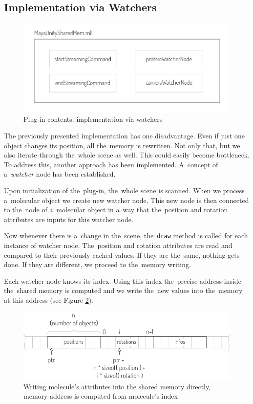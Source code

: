 \documentclass[
  digital, %
  table,   %
  nolof,     %
  nolot,     %
  oneside,
]{fithesis3}
\begin{document}
\subsection{Implementation via Watchers}
\begin{figure}
  \centering
  \includegraphics[scale=0.8]{images/plugin-contents-watchers.pdf}
  \caption{Plug-in contents: implementation via watchers}
  \label{fig:plugin-content-watchers}
\end{figure}

The previously presented implementation has one disadvantage. Even if just one object changes its position, all the memory is rewritten. Not only that, but we also iterate through the whole scene as well. This could easily become bottleneck. To address this, another approach has been implemented. A concept of a \textit{watcher} node has been established.

Upon initialization of the plug-in, the whole scene is scanned. When we process a molecular object we create new watcher node. This new node is then connected to the node of a molecular object in a way that the position and rotation attributes are inputs for this watcher node.

Now whenever there is a change in the scene, the \texttt{draw} method is called for each instance of watcher node. The position and rotation attributes are read and compared to their previously cached values. If they are the same, nothing gets done. If they are different, we proceed to the memory writing.

Each watcher node knows its index. Using this index the precise address inside the shared memory is computed and we write the new values into the memory at this address (see Figure \ref{fig:direct-writing}).

\begin{figure}
  \centering
  \includegraphics[scale=1.0]{images/direct-writing.pdf}
  \caption{Writing molecule's attributes into the shared memory directly, memory address is computed from molecule's index}
  \label{fig:direct-writing}
\end{figure}
\end{document}
